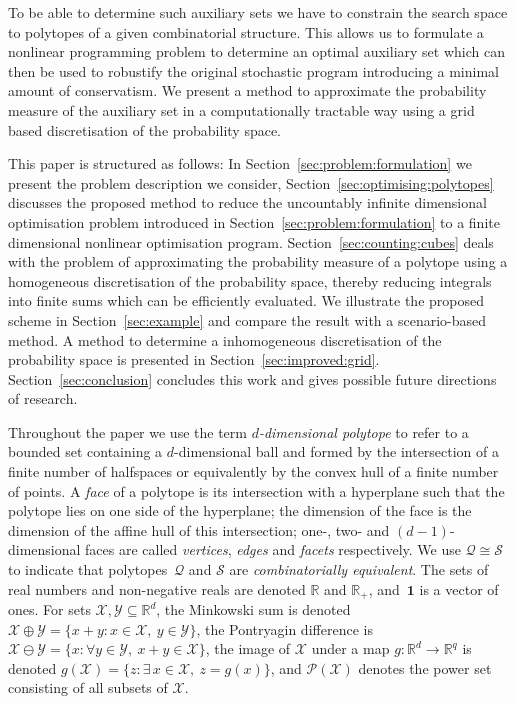 \documentclass[letterpaper, 10pt, conference]{ieeeconf} %
\providecommand{\bfa}[1]{\mathbf{#1}}
\begin{document}
To be able to determine such auxiliary sets we have to constrain the search space to polytopes of a given combinatorial structure.
%
This allows us to formulate a nonlinear programming problem to determine an optimal auxiliary set which can then be used to robustify the original stochastic program introducing a minimal amount of conservatism.
%
We present a method to approximate the probability measure of the auxiliary set in a computationally tractable way using a grid based discretisation of the probability space.
%


%
This paper is structured as follows:
%
In Section~\ref{sec:problem:formulation} we present the problem description we consider, Section~\ref{sec:optimising:polytopes} discusses the proposed method to reduce the uncountably infinite dimensional optimisation problem introduced in Section~\ref{sec:problem:formulation} to a finite dimensional nonlinear optimisation program.
%
Section~\ref{sec:counting:cubes} deals with the problem of approximating the probability measure of a polytope using a homogeneous discretisation of the probability space, thereby reducing integrals into finite sums which can be efficiently evaluated.
%
We illustrate the proposed scheme in Section~\ref{sec:example} and compare the result with a scenario-based method.
%
A method to determine a inhomogeneous discretisation of the probability space is presented in Section~\ref{sec:improved:grid}.
%
Section~\ref{sec:conclusion} concludes this work and gives possible future directions of research.
%


%
Throughout the paper we use the term \textit{$d$-dimensional polytope} to refer to a bounded set containing a $d$-dimensional ball and formed by the intersection of a finite number of halfspaces or equivalently by the convex hull of a finite number of points.
A \textit{face} of a polytope is its intersection with a hyperplane such that the polytope lies on one side of the hyperplane; the dimension of the face is the dimension of the affine hull of this intersection; one-, two- and ${(d-1)}$-dimensional faces are called \textit{vertices}, \textit{edges} and \textit{facets} respectively. 
We use $\mathcal Q \cong \mathcal S$ to indicate that polytopes~$\mathcal Q$ and $\mathcal S$ are \textit{combinatorially equivalent}.
%
The sets of real numbers and non-negative reals are denoted $\mathbb R$ and $\mathbb R_+$, and~$\bfa{1}$ is a vector of ones. 
%
For sets $\mathcal X,\mathcal Y\subseteq\mathbb R^d$, the Minkowski sum is denoted $\mathcal X \oplus \mathcal Y = \{ x + y : x\in\mathcal X, \ y\in \mathcal Y\}$, the Pontryagin difference is $\mathcal X \ominus \mathcal Y = \{ x: \forall y \in \mathcal Y, \ x+ y\in\mathcal X \}$, the image of $\mathcal X$ under a map $g:\mathbb R^d \to \mathbb R^q$ is denoted $g(\mathcal X) = \{z : \exists\, x\in\mathcal X, \ z = g(x)\}$, and $\mathscr P (\mathcal X)$ denotes the power set consisting of all subsets of $\mathcal X$.
\end{document}

